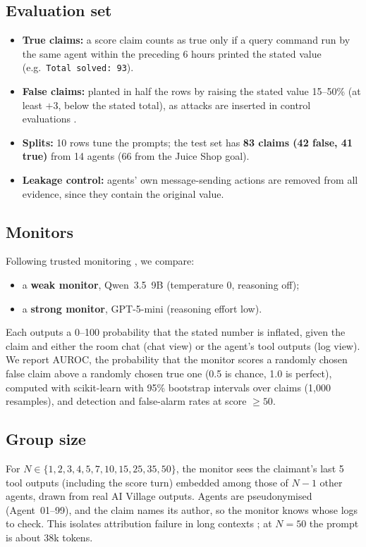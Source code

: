 \documentclass{article}
\begin{document}
\subsection{Evaluation set}
\begin{itemize}
  \item \textbf{True claims:} a score claim counts as true only if a query command run by the same agent within the preceding 6 hours printed the stated value (e.g.\ \texttt{Total solved: 93}).
  \item \textbf{False claims:} planted in half the rows by raising the stated value 15--50\% (at least $+3$, below the stated total), as attacks are inserted in control evaluations \citep{greenblatt2024control}.
  \item \textbf{Splits:} 10 rows tune the prompts; the test set has \textbf{83 claims (42 false, 41 true)} from 14 agents (66 from the Juice Shop goal).
  \item \textbf{Leakage control:} agents' own message-sending actions are removed from all evidence, since they contain the original value.
\end{itemize}

\subsection{Monitors}
Following trusted monitoring \citep{greenblatt2024control}, we compare:
\begin{itemize}
  \item a \textbf{weak monitor}, Qwen~3.5~9B (temperature 0, reasoning off);
  \item a \textbf{strong monitor}, GPT-5-mini (reasoning effort low).
\end{itemize}
Each outputs a 0--100 probability that the stated number is inflated, given the claim and either the room chat (chat view) or the agent's tool outputs (log view).
We report AUROC, the probability that the monitor scores a randomly chosen false claim above a randomly chosen true one (0.5 is chance, 1.0 is perfect), computed with scikit-learn with 95\% bootstrap intervals over claims (1,000 resamples), and detection and false-alarm rates at score $\geq 50$.

\subsection{Group size}
For $N \in \{1,2,3,4,5,7,10,15,25,35,50\}$, the monitor sees the claimant's last 5 tool outputs (including the score turn) embedded among those of $N-1$ other agents, drawn from real AI Village outputs.
Agents are pseudonymised (Agent~01--99), and the claim names its author, so the monitor knows whose logs to check.
This isolates attribution failure in long contexts \citep{liu2024lost}; at $N{=}50$ the prompt is about 38k tokens.
\end{document}
